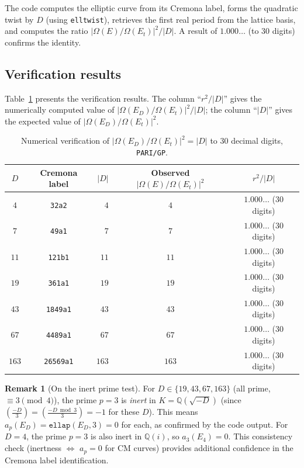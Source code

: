 \documentclass[12pt,a4paper]{article}
\theoremstyle{plain}
\theoremstyle{definition}
\newtheorem{remark}[theorem]{Remark}
\newcommand{\Q}{\mathbb{Q}}
\begin{document}
The code computes the elliptic curve from its Cremona label, forms the
quadratic twist by $D$ (using \texttt{elltwist}), retrieves the first real
period from the lattice basis, and computes the ratio $|\Omega(E)/\Omega(E_t)|^2/|D|$.
A result of $1.000\ldots$ (to 30 digits) confirms the identity.

\subsection{Verification results}

Table~\ref{tab:verify} presents the verification results.  The column
``$r^2/|D|$'' gives the numerically computed value of
$|\Omega(E_D)/\Omega(E_t)|^2 / |D|$; the column ``$|D|$'' gives the
expected value of $|\Omega(E_D)/\Omega(E_t)|^2$.

\begin{table}[h]
\centering
\caption{Numerical verification of $|\Omega(E_D)/\Omega(E_t)|^2 = |D|$
         to 30 decimal digits, \texttt{PARI/GP}.}
\label{tab:verify}
\begin{tabular}{ccrcc}
\toprule
$D$ & Cremona label & $|D|$ & Observed $|\Omega(E)/\Omega(E_t)|^2$ & $r^2/|D|$ \\
\midrule
$4$   & \texttt{32a2}    &   $4$ & $4$   & $1.000\ldots$ (30 digits) \\
$7$   & \texttt{49a1}    &   $7$ & $7$   & $1.000\ldots$ (30 digits) \\
$11$  & \texttt{121b1}   &  $11$ & $11$  & $1.000\ldots$ (30 digits) \\
$19$  & \texttt{361a1}   &  $19$ & $19$  & $1.000\ldots$ (30 digits) \\
$43$  & \texttt{1849a1}  &  $43$ & $43$  & $1.000\ldots$ (30 digits) \\
$67$  & \texttt{4489a1}  &  $67$ & $67$  & $1.000\ldots$ (30 digits) \\
$163$ & \texttt{26569a1} & $163$ & $163$ & $1.000\ldots$ (30 digits) \\
\bottomrule
\end{tabular}
\end{table}

\begin{remark}[On the inert prime test]
For $D \in \{19, 43, 67, 163\}$ (all prime, $\equiv 3 \pmod 4$), the prime
$p = 3$ is \emph{inert} in $K = \Q(\sqrt{-D})$ (since
$\left(\frac{-D}{3}\right) = \left(\frac{-D \bmod 3}{3}\right) = -1$ for
these $D$).  This means $a_p(E_D) = \texttt{ellap}(E_D, 3) = 0$ for each,
as confirmed by the code output.  For $D = 4$, the prime $p = 3$ is also
inert in $\Q(i)$, so $a_3(E_4) = 0$.  This consistency check (inertness
$\Leftrightarrow$ $a_p = 0$ for CM curves) provides additional confidence in
the Cremona label identification.
\end{remark}
\end{document}
